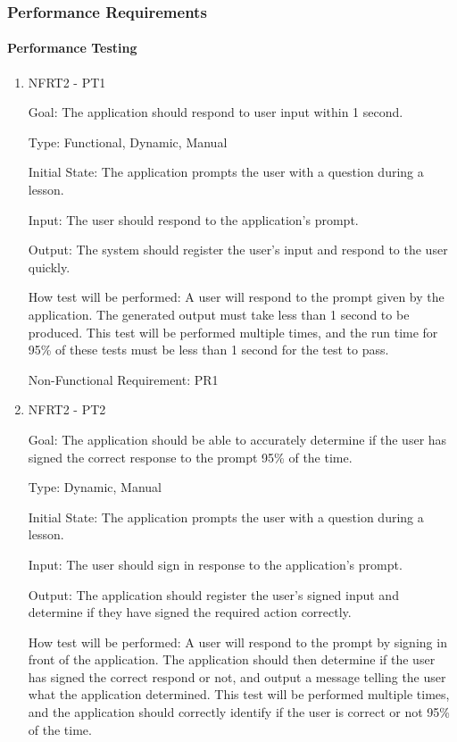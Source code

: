 \documentclass[12pt, titlepage]{article}
\begin{document}
\subsubsection{Performance Requirements}

\paragraph{Performance Testing}

\begin{enumerate}

\item{NFRT2 - PT1}

Goal: The application should respond to user input within 1 second. 

Type: Functional, Dynamic, Manual
					
Initial State: The application prompts the user with a question during a lesson. 
					
Input: The user should respond to the application's prompt.
					
Output: The system should register the user's input and respond to the user quickly. 
					
How test will be performed: A user will respond to the prompt given by the application. The generated output must take less than 1 second to be produced. This test will be performed multiple times, and the run time for 95\% of these tests must be less than 1 second for the test to pass. 

Non-Functional Requirement: PR1

\item{NFRT2 - PT2}

Goal: The application should be able to accurately determine if the user has signed the correct response to the prompt 95\% of the time. 

Type: Dynamic, Manual
					
Initial State: The application prompts the user with a question during a lesson. 
					
Input: The user should sign in response to the application's prompt.
					
Output: The application should register the user's signed input and determine if they have signed the required action correctly.
					
How test will be performed: A user will respond to the prompt by signing in front of the application. The application should then determine if the user has signed the correct respond or not, and output a message telling the user what the application determined. This test will be performed multiple times, and the application should correctly identify if the user is correct or not 95\% of the time.


\end{enumerate}
\end{document}
